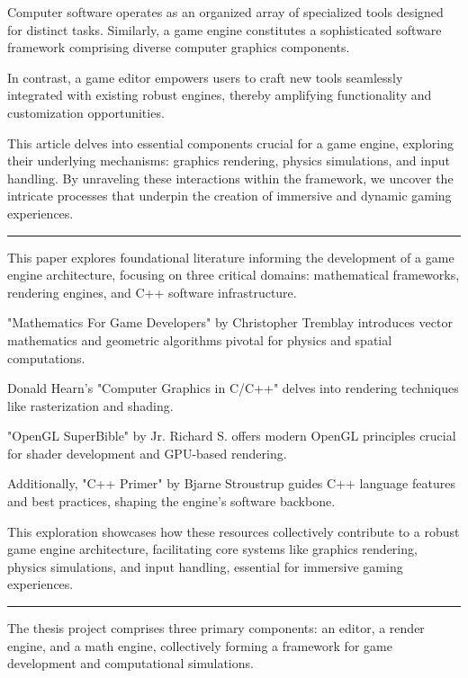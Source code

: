 





Computer software operates as an organized array of specialized tools designed for distinct tasks. Similarly, a game engine constitutes a sophisticated software framework comprising diverse computer graphics components.

In contrast, a game editor empowers users to craft new tools seamlessly integrated with existing robust engines, thereby amplifying functionality and customization opportunities.

This article delves into essential components crucial for a game engine, exploring their underlying mechanisms: graphics rendering, physics simulations, and input handling. By unraveling these interactions within the framework, we uncover the intricate processes that underpin the creation of immersive and dynamic gaming experiences.

\vspace{0.5cm}
\hrule
\vspace{0.5cm}

This paper explores foundational literature informing the development of a game engine architecture, focusing on three critical domains: mathematical frameworks, rendering engines, and C++ software infrastructure.

"Mathematics For Game Developers" by Christopher Tremblay introduces vector mathematics and geometric algorithms pivotal for physics and spatial computations. 

Donald Hearn's "Computer Graphics in C/C++" delves into rendering techniques like rasterization and shading. 

"OpenGL SuperBible" by Jr. Richard S. offers modern OpenGL principles crucial for shader development and GPU-based rendering. 

Additionally, "C++ Primer" by Bjarne Stroustrup guides C++ language features and best practices, shaping the engine's software backbone.

This exploration showcases how these resources collectively contribute to a robust game engine architecture, facilitating core systems like graphics rendering, physics simulations, and input handling, essential for immersive gaming experiences.

\vspace{0.5cm}
\hrule
\vspace{0.5cm}

The thesis project comprises three primary components: an editor, a render engine, and a math engine, collectively forming a framework for game development and computational simulations.

